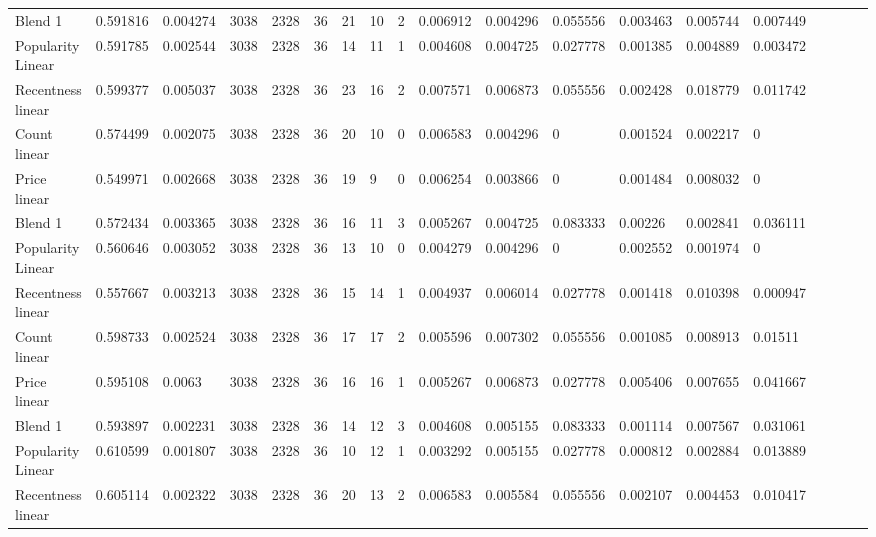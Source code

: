 \begin{table}[H]
{\begin{tabular}{*{19}l}
Blend 1				&	0.591816 &	0.004274 &	3038 &	2328 &	36 &	21 &	10 &	2 &	0.006912 &	0.004296 &	0.055556 &	0.003463 &	0.005744 &	0.007449 &	 \\
Popularity Linear	&	0.591785 &	0.002544 &	3038 &	2328 &	36 &	14 &	11 &	1 &	0.004608 &	0.004725 &	0.027778 &	0.001385 &	0.004889 &	0.003472 &	 \\
Recentness linear	&	0.599377 &	0.005037 &	3038 &	2328 &	36 &	23 &	16 &	2 &	0.007571 &	0.006873 &	0.055556 &	0.002428 &	0.018779 &	0.011742 &	 \\
Count linear		&	0.574499 &	0.002075 &	3038 &	2328 &	36 &	20 &	10 &	0 &	0.006583 &	0.004296 &	0 		 &	0.001524 &	0.002217 &	0 		 &	 \\
Price linear		&	0.549971 &	0.002668 &	3038 &	2328 &	36 &	19 &	9  &	0 &	0.006254 &	0.003866 &	0 		 &	0.001484 &	0.008032 &	0 		 &	 \\
Blend 1				&	0.572434 &	0.003365 &	3038 &	2328 &	36 &	16 &	11 &	3 &	0.005267 &	0.004725 &	0.083333 &	0.00226  &	0.002841 &	0.036111 &	 \\
Popularity Linear	&	0.560646 &	0.003052 &	3038 &	2328 &	36 &	13 &	10 &	0 &	0.004279 &	0.004296 &	0 		 &	0.002552 &	0.001974 &	0 		 &	 \\
Recentness linear	&	0.557667 &	0.003213 &	3038 &	2328 &	36 &	15 &	14 &	1 &	0.004937 &	0.006014 &	0.027778 &	0.001418 &	0.010398 &	0.000947 &	 \\
Count linear		&	0.598733 &	0.002524 &	3038 &	2328 &	36 &	17 &	17 &	2 &	0.005596 &	0.007302 &	0.055556 &	0.001085 &	0.008913 &	0.01511  &	 \\
Price linear		&	0.595108 &	0.0063 &	3038 &	2328 &	36 &	16 &	16 &	1 &	0.005267 &	0.006873 &	0.027778 &	0.005406 &	0.007655 &	0.041667 &	 \\
Blend 1				&	0.593897 &	0.002231 &	3038 &	2328 &	36 &	14 &	12 &	3 &	0.004608 &	0.005155 &	0.083333 &	0.001114 &	0.007567 &	0.031061 &	 \\
Popularity Linear	&	0.610599 &	0.001807 &	3038 &	2328 &	36 &	10 &	12 &	1 &	0.003292 &	0.005155 &	0.027778 &	0.000812 &	0.002884 &	0.013889 &	 \\
Recentness linear	&	0.605114 &	0.002322 &	3038 &	2328 &	36 &	20 &	13 &	2 &	0.006583 &	0.005584 &	0.055556 &	0.002107 &	0.004453 &	0.010417 &	 \\


\end{tabular}}
\end{table}
